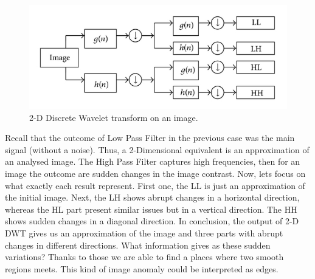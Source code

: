 \begin{figure}[h]
	\centering
	\includegraphics[width=\textwidth]{2D_DWT.JPG}
	\caption{2-D Discrete Wavelet transform on an image.}
	\label{fig:2D_DWT}
\end{figure}

Recall that the outcome of Low Pass Filter in the previous case was the main signal (without a noise). Thus, a 2-Dimensional equivalent is an approximation of an analysed image. The High Pass Filter captures high frequencies, then for an image the outcome are sudden changes in the image contrast. Now, lets focus on what exactly each result represent. First one, the LL is just an approximation of the initial image. Next, the LH shows abrupt changes in a horizontal direction, whereas the HL part present similar issues but in a vertical direction. The HH shows sudden changes in a diagonal direction. In conclusion, the output of 2-D DWT gives us an approximation of the image and three parts with abrupt changes in different directions. What information gives as these sudden variations? Thanks to those we are able to find a places where two smooth regions meets. This kind of image anomaly could be interpreted as edges.


